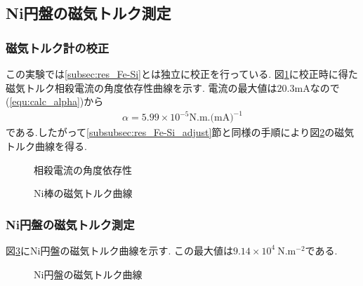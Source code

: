 \subsection{Ni円盤の磁気トルク測定}
\subsubsection{磁気トルク計の校正}
この実験では\ref{subsec:res_Fe-Si}とは独立に校正を行っている.
図\ref{fig:Ni_adjust}に校正時に得た磁気トルク相殺電流の角度依存性曲線を示す.
電流の最大値は$20.3\si{\milli\ampere}$なので(\ref{equ:calc_alpha})から
\begin{align}
  \alpha=5.99\times10^{-5} \si{\newton.\metre.(\milli\ampere)^{-1}}
\end{align}
である.したがって\ref{subsubsec:res_Fe-Si_adjust}節と同様の手順により図\ref{fig:Ni_adjust_torque}の磁気トルク曲線を得る.
\begin{figure}[hptb]
  \begin{center}
    
    \caption{相殺電流の角度依存性}
    \label{fig:Ni_adjust}
  \end{center}
\end{figure}
\begin{figure}[hptb]
  \begin{center}
    
    \caption{Ni棒の磁気トルク曲線}
    \label{fig:Ni_adjust_torque}
  \end{center}
\end{figure}
\newpage
\subsubsection{Ni円盤の磁気トルク測定}
図\ref{fig:Ni_torque}にNi円盤の磁気トルク曲線を示す.
この最大値は$9.14\times10^4\ \si{\newton.\metre^{-2}}$である.
\begin{figure}[hptb]
  \begin{center}
    
    \caption{Ni円盤の磁気トルク曲線}
    \label{fig:Ni_torque}
  \end{center}
\end{figure}